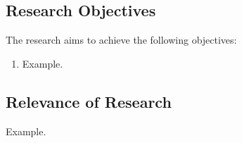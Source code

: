 \subsection{Research Objectives}

The research aims to achieve the following objectives:
\begin{enumerate}
	\item Example.
\end{enumerate}

\subsection{Relevance of Research}

Example.
